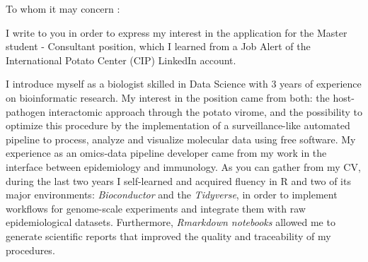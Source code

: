\documentclass{letter} 					%
\begin{document}
\begin{letter}
%

 
\opening{To whom it may concern :} 
 
\noindent 
I write to you in order to express my interest in the application for the Master student - Consultant position,
which I learned from a Job Alert of the International Potato Center (CIP) LinkedIn account.

\noindent 
I introduce myself as a biologist skilled in Data Science with 3 years of experience on bioinformatic research.
My interest in the position came from both: the host-pathogen interactomic approach through the potato virome, and the possibility to optimize this procedure by the implementation of a surveillance-like automated pipeline to process, analyze and visualize molecular data using free software.
My experience as an omics-data pipeline developer came from my work in the interface between epidemiology and immunology.
As you can gather from my CV, during the last two years I self-learned and acquired fluency in R and two of its major environments: \textit{Bioconductor} and the \textit{Tidyverse}, in order to implement workflows for genome-scale experiments and integrate them with raw epidemiological datasets. Furthermore, \textit{Rmarkdown notebooks} allowed me to generate scientific reports that improved the quality and traceability of my procedures.

\end{letter}
\end{document}
